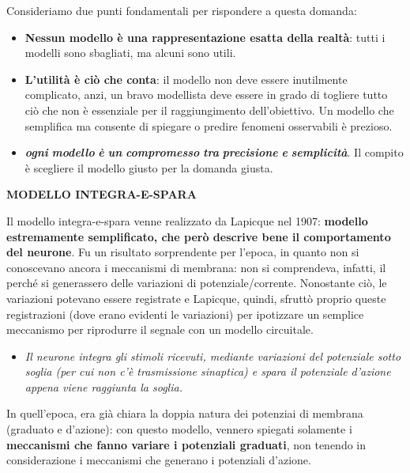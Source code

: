 Consideriamo due punti fondamentali per rispondere a questa domanda:

\begin{itemize}
  \item \textbf{Nessun modello è una rappresentazione esatta della realtà}: tutti i modelli sono sbagliati, ma alcuni sono utili.
  \item \textbf{L'utilità è ciò che conta}: il modello non deve essere inutilmente complicato, anzi, un bravo modellista deve essere in grado di togliere tutto ciò che non è essenziale per il raggiungimento dell'obiettivo. Un modello che semplifica ma consente di spiegare o predire fenomeni osservabili è prezioso.
  \item \textbf{\textit{ogni}}\textbf{\textit{ }}\textbf{\textit{modello}}\textbf{\textit{ }}\textbf{\textit{è}}\textbf{\textit{ }}\textbf{\textit{un}}\textbf{\textit{ }}\textbf{\textit{compromesso}}\textbf{\textit{ }}\textbf{\textit{tra}}\textbf{\textit{ }}\textbf{\textit{precisione}}\textbf{\textit{ }}\textbf{\textit{e}}\textbf{\textit{ }}\textbf{\textit{semplicità}}. Il compito è scegliere il modello giusto per la domanda giusta.
\end{itemize}
\textbf{MODELLO  INTEGRA-E-SPARA}

Il modello integra-e-spara venne realizzato da Lapicque nel 1907: \textbf{modello estremamente semplificato, che però descrive bene il comportamento del neurone}. Fu un risultato sorprendente per l'epoca, in quanto non si conoscevano ancora i meccanismi di membrana: non si comprendeva, infatti, il perché si generassero delle variazioni di potenziale/corrente. Nonostante ciò, le variazioni potevano essere registrate e Lapicque, quindi, sfruttò proprio queste registrazioni (dove erano evidenti le variazioni) per ipotizzare un semplice meccanismo per riprodurre il segnale con un modello circuitale.

\begin{itemize}
  \item \textit{Il neurone integra gli stimoli ricevuti, mediante variazioni del potenziale sotto soglia (per cui non c'è trasmissione sinaptica) e spara il potenziale d'azione appena viene raggiunta la soglia.}
\end{itemize}
In quell'epoca, era già chiara la doppia natura dei potenziai di membrana (graduato e d'azione): con questo modello, vennero spiegati solamente i \textbf{meccanismi che fanno variare i potenziali graduati}, non tenendo in considerazione i meccanismi che generano i potenziali d'azione.

